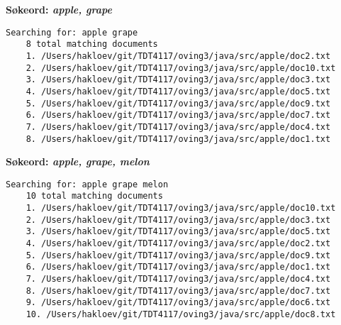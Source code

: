 \noindent \textbf{Søkeord: \textit{apple, grape}} \hfill
\begin{lstlisting}[frame=single]
Searching for: apple grape
    8 total matching documents
    1. /Users/hakloev/git/TDT4117/oving3/java/src/apple/doc2.txt
    2. /Users/hakloev/git/TDT4117/oving3/java/src/apple/doc10.txt
    3. /Users/hakloev/git/TDT4117/oving3/java/src/apple/doc3.txt
    4. /Users/hakloev/git/TDT4117/oving3/java/src/apple/doc5.txt
    5. /Users/hakloev/git/TDT4117/oving3/java/src/apple/doc9.txt
    6. /Users/hakloev/git/TDT4117/oving3/java/src/apple/doc7.txt
    7. /Users/hakloev/git/TDT4117/oving3/java/src/apple/doc4.txt
    8. /Users/hakloev/git/TDT4117/oving3/java/src/apple/doc1.txt
\end{lstlisting}

\noindent \textbf{Søkeord: \textit{apple, grape, melon}} \hfill
\begin{lstlisting}
Searching for: apple grape melon
    10 total matching documents
    1. /Users/hakloev/git/TDT4117/oving3/java/src/apple/doc10.txt
    2. /Users/hakloev/git/TDT4117/oving3/java/src/apple/doc3.txt
    3. /Users/hakloev/git/TDT4117/oving3/java/src/apple/doc5.txt
    4. /Users/hakloev/git/TDT4117/oving3/java/src/apple/doc2.txt
    5. /Users/hakloev/git/TDT4117/oving3/java/src/apple/doc9.txt
    6. /Users/hakloev/git/TDT4117/oving3/java/src/apple/doc1.txt
    7. /Users/hakloev/git/TDT4117/oving3/java/src/apple/doc4.txt
    8. /Users/hakloev/git/TDT4117/oving3/java/src/apple/doc7.txt
    9. /Users/hakloev/git/TDT4117/oving3/java/src/apple/doc6.txt
    10. /Users/hakloev/git/TDT4117/oving3/java/src/apple/doc8.txt
\end{lstlisting}
